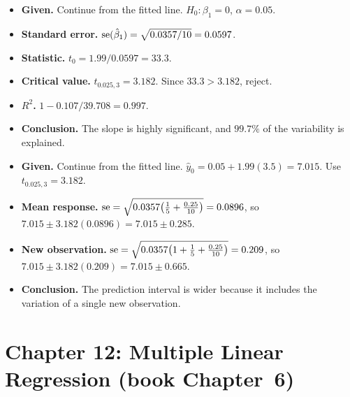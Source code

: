 \begin{example}
\begin{itemize}
  \item \textbf{Given.} Continue from the fitted line. $H_0:\beta_1=0$, $\alpha=0.05$.
  \item \textbf{Standard error.} $\operatorname{se}(\hat\beta_1)=\sqrt{0.0357/10}=0.0597$.
  \item \textbf{Statistic.} $t_0=1.99/0.0597=33.3$.
  \item \textbf{Critical value.} $t_{0.025,3}=3.182$. Since $33.3>3.182$, reject.
  \item \textbf{$R^2$.} $1-0.107/39.708=0.997$.
  \item \textbf{Conclusion.} The slope is highly significant, and $99.7\%$ of the variability is explained.
\end{itemize}
\end{example}

\begin{example}[Intervals at $x_0=3.5$]
\begin{itemize}
  \item \textbf{Given.} Continue from the fitted line. $\hat{y}_0=0.05+1.99(3.5)=7.015$. Use $t_{0.025,3}=3.182$.
  \item \textbf{Mean response.} $\operatorname{se}=\sqrt{0.0357\big(\tfrac15+\tfrac{0.25}{10}\big)}=0.0896$, so $7.015\pm3.182(0.0896)=7.015\pm0.285$.
  \item \textbf{New observation.} $\operatorname{se}=\sqrt{0.0357\big(1+\tfrac15+\tfrac{0.25}{10}\big)}=0.209$, so $7.015\pm3.182(0.209)=7.015\pm0.665$.
  \item \textbf{Conclusion.} The prediction interval is wider because it includes the variation of a single new observation.
\end{itemize}
\end{example}

\section{Chapter 12: Multiple Linear Regression (book Chapter~6)}

